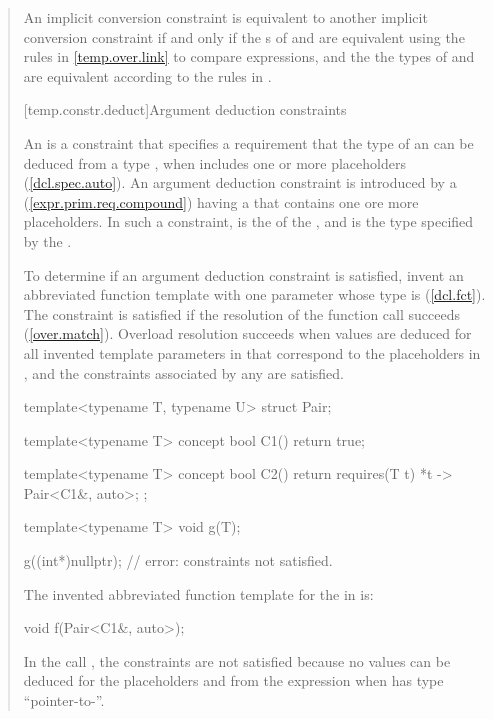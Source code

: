 \begin{quote}
\pnum
An implicit conversion constraint  is equivalent to another implicit 
conversion constraint  if and only if the s 
of  and  are equivalent using the rules in
\ref{temp.over.link} to compare expressions, and the the types
of  and  are equivalent according to the rules in
.


[temp.constr.deduct]{Argument deduction constraints}

\pnum
An  is a constraint that specifies 
a requirement that the type of an  
can be deduced from a type , when  includes one or more 
placeholders (\ref{dcl.spec.auto}).
% 
\enternote
An argument deduction constraint is introduced by a
 (\ref{expr.prim.req.compound}) having a
 that contains one ore more placeholders.
% 
In such a constraint,  is the  of the 
, and  is the type specified
by the .
\exitnote

\pnum
To determine if an argument deduction constraint is satisfied, invent
an abbreviated function template  with one parameter whose
type is  (\ref{dcl.fct}). 
% 
The constraint is satisfied if the resolution of the function call 
 succeeds (\ref{over.match}).
% 
\enternote
Overload resolution succeeds when values are deduced for all invented
template parameters in  that correspond to the placeholders in 
, and the constraints associated by any 
 are satisfied.
\exitnote

\enterexample
\begin{codeblock}
template<typename T, typename U>
  struct Pair;

template<typename T>
  concept bool C1() { return true; }

template<typename T>
  concept bool C2() { return requires(T t) { {*t} -> Pair<C1&, auto>; }; }

template<typename T>
  void g(T);

g((int*)nullptr); // error: constraints not satisfied.
\end{codeblock}
The invented abbreviated function template  for the 
 in  is:
\begin{codeblock}
void f(Pair<C1&, auto>);
\end{codeblock}
In the call , the constraints are not satisfied 
because no values can be deduced for the placeholders  and 
 from the expression  when  has type
``pointer-to-''.
\exitexample


\end{quote}
